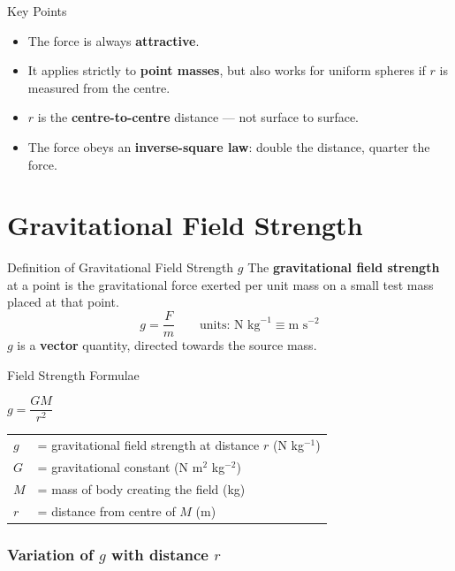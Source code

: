 \begin{keybox}{Key Points}
\begin{itemize}[itemsep=2pt]
  \item The force is always \textbf{attractive}.
  \item It applies strictly to \textbf{point masses}, but also works for uniform spheres if $r$ is measured from the centre.
  \item $r$ is the \textbf{centre-to-centre} distance — not surface to surface.
  \item The force obeys an \textbf{inverse-square law}: double the distance, quarter the force.
\end{itemize}
\end{keybox}

\section{Gravitational Field Strength}

\begin{definitionbox}{Definition of Gravitational Field Strength $g$}
The \textbf{gravitational field strength} at a point is the gravitational force exerted per unit mass on a small test mass placed at that point.
$$g = \frac{F}{m} \qquad \text{units: N kg}^{-1} \equiv \text{m s}^{-2}$$
$g$ is a \textbf{vector} quantity, directed towards the source mass.
\end{definitionbox}

\begin{formulabox}{Field Strength Formulae}
\begin{center}
\Large $g = \dfrac{GM}{r^2}$
\end{center}
\vspace{0.3em}
\begin{tabular}{@{}ll@{}}
$g$ & = gravitational field strength at distance $r$ (N kg$^{-1}$) \\
$G$ & = gravitational constant (N m$^2$ kg$^{-2}$) \\
$M$ & = mass of body creating the field (kg) \\
$r$ & = distance from centre of $M$ (m) \\
\end{tabular}
\end{formulabox}

\subsubsection*{Variation of $g$ with distance $r$}

